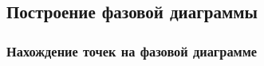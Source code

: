 \documentclass[pdf,hyperref={unicode}]{beamer}
\begin{document}
\subsection{Построение фазовой диаграммы}


\begin{frame}
\transdissolve[duration=0.2]
\frametitle{Нахождение точек на фазовой диаграмме}
\begin{columns}


\begin{column}{0.55\linewidth}
{
\begin{figure}[h]
\end{figure}
}
\end{column}


\end{columns}
\end{frame}
\end{document}
